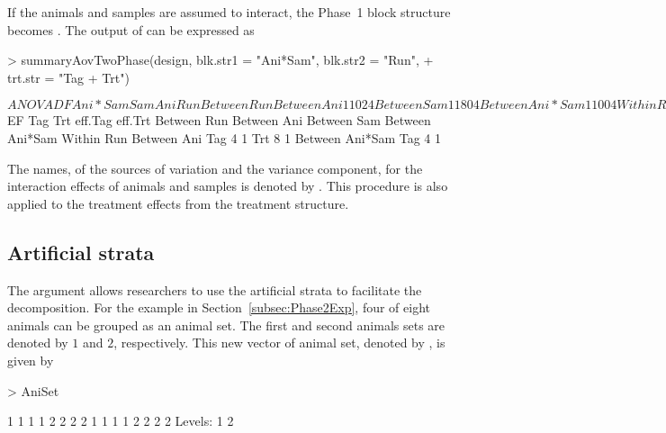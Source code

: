 \documentclass[article]{jss}
\begin{document}
If the animals and samples are assumed to interact, the Phase~1 block structure becomes . The output of  can be expressed as
\begin{CodeChunk}
\begin{CodeInput}
> summaryAovTwoPhase(design, blk.str1 = "Ani*Sam", blk.str2 = "Run", 
+ trt.str = "Tag + Trt")                                     
\end{CodeInput}
\begin{CodeOutput}
$ANOVA
                   DF Ani*Sam Sam Ani Run
Between Run                              
   Between Ani     1  1       0   2   4  
   Between Sam     1  1       8   0   4  
   Between Ani*Sam 1  1       0   0   4  
Within Run                               
   Between Ani                           
      Tag          1  1       0   2   0  
      Trt          1  1       0   2   0  
      Residual     4  1       0   2   0  
   Between Ani*Sam                       
      Tag          2  1       0   0   0  
      Residual     4  1       0   0   0  

$EF
                   Tag Trt eff.Tag eff.Trt
Between Run                               
   Between Ani                            
   Between Sam                            
   Between Ani*Sam                        
Within Run                                
   Between Ani                            
      Tag          4       1              
      Trt              8           1      
   Between Ani*Sam                        
      Tag          4       1                  
\end{CodeOutput}
\end{CodeChunk}
The names, of the sources of variation and the variance component, for the interaction effects of animals and samples is denoted by . This procedure is also applied to the treatment effects from the treatment structure. 

\subsection{Artificial strata}
The  argument allows researchers to use the artificial strata to facilitate the decomposition. For the example in Section~\ref{subsec:Phase2Exp}, four of eight animals can be grouped as an animal set. The first and second animals sets are denoted by $1$ and $2$, respectively. This new vector of animal set, denoted by , is given by
\begin{CodeChunk}
\begin{CodeInput}
> AniSet
\end{CodeInput}
\begin{CodeOutput}
 [1] 1 1 1 1 2 2 2 2 1 1 1 1 2 2 2 2
Levels: 1 2
\end{CodeOutput}
\end{CodeChunk}
\end{document}
